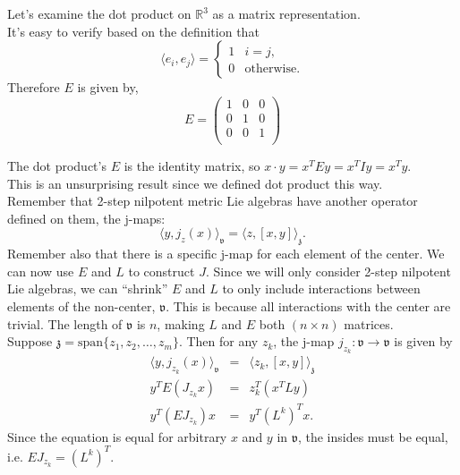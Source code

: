 \documentclass[11 pt]{article}
\newcommand{\br}[2]{\left[#1,#2\right]}
\newcommand{\inp}[2]{\langle #1, #2 \rangle}
\newcommand{\fz}{\mathfrak{z}}
\newcommand{\fv}{\mathfrak{v}}
\newcommand{\RR}{\mathbb{R}}
\begin{document}
    \begin{example}
        Let's examine the dot product on $\RR^3$ as a matrix representation.
        \\It's easy to verify based on the definition that
        $$
        \inp{e_i}{e_j}
        = \begin{cases}
            1 & i = j, \\
            0 & \text{otherwise}.
        \end{cases}
        $$
        Therefore $E$ is given by,
        $$
        E = \begin{pmatrix}
            1 & 0 & 0\\
            0 & 1 & 0\\
            0 & 0 & 1\\
        \end{pmatrix}
        $$
    \end{example}
    The dot product's $E$ is the identity matrix, so
    $x \cdot y = x^{T}Ey = x^{T}Iy = x^{T}y$.
    \\This is an unsurprising result since we defined dot product this way.
    \\Remember that 2-step nilpotent metric Lie algebras have another operator
    defined on them, the j-maps:
    $$
    \inp{y}{j_z(x)}_\fv = \inp{z}{\br{x}{y}}_\fz.
    $$
    Remember also that there is a specific j-map for each element of the
    center.  We can now use $E$ and $L$ to construct $J$.
    Since we will only consider 2-step nilpotent Lie algebras, we can
    ``shrink'' $E$ and $L$ to only include interactions between elements of
    the non-center, $\fv$.  This is because all interactions with the center
    are trivial. The length of $\fv$ is $n$, making $L$ and $E$ both
    $(n \times n)$ matrices.
    \smallskip
    \\Suppose $\fz = \text{span} \{ z_1,z_2,\hdots,z_m \}$.  Then for any $z_k$,
    the j-map $j_{z_k}: \fv \to \fv$ is given by
    \begin{eqnarray*}
        \inp{y}{j_{z_k}(x)}_\fv	& = & \inp{z_k}{\br{x}{y}}_\fz \\
        y^T E (J_{z_k}x)		& = & z_k^T (x^TLy)\\
        y^T (E J_{z_k}) x		& = & y^T(L^k)^T x.
    \end{eqnarray*}
    Since the equation is equal for arbitrary $x$ and $y$ in $\fv$,
    the insides must be equal, i.e. $EJ_{z_k} = (L^k)^T$.
\end{document}

